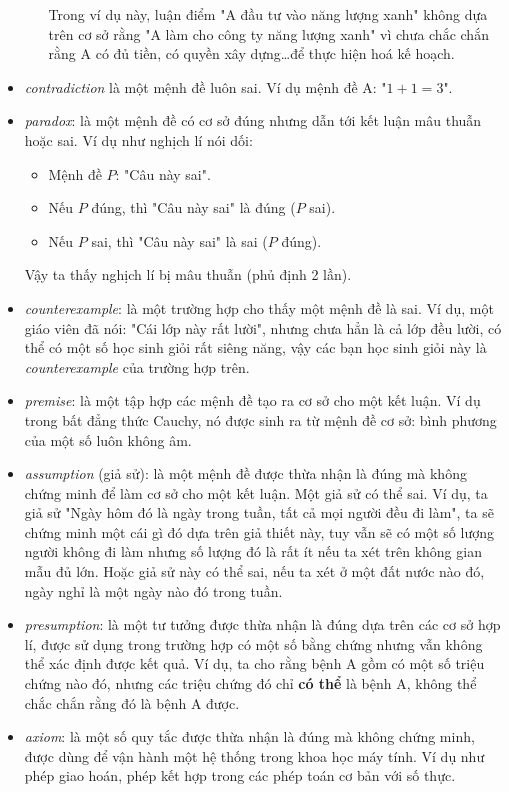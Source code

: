 \begin{itemize}
\begin{itemize}
\begin{itemize}
        \end{itemize}
        Trong ví dụ này, luận điểm "A đầu tư vào năng lượng xanh" không dựa trên cơ sở rằng "A làm cho công ty năng lượng xanh" vì chưa chắc chắn rằng A có đủ tiền, có quyền xây dựng\dots để thực hiện hoá kế hoạch.
    \end{itemize}
    \item \textit{contradiction} là một mệnh đề luôn sai. Ví dụ mệnh đề A: "$1+1=3$".
    \item \textit{paradox}: là một mệnh đề có cơ sở đúng nhưng dẫn tới kết luận mâu thuẫn hoặc sai. Ví dụ như nghịch lí nói dối: \begin{itemize}
        \item Mệnh đề $P$: "Câu này sai".
        \item Nếu $P$ đúng, thì "Câu này sai" là đúng ($P$ sai).
        \item Nếu $P$ sai, thì "Câu này sai" là sai ($P$ đúng).
    \end{itemize}
    Vậy ta thấy nghịch lí bị mâu thuẫn (phủ định 2 lần).
    \item \textit{counterexample}: là một trường hợp cho thấy một mệnh đề là sai. Ví dụ, một giáo viên đã nói: "Cái lớp này rất lười", nhưng chưa hẳn là cả lớp đều lười, có thể có một số học sinh giỏi rất siêng năng, vậy các bạn học sinh giỏi này là \textit{counterexample} của trường hợp trên.
    \item \textit{premise}: là một tập hợp các mệnh đề tạo ra cơ sở cho một kết luận. Ví dụ trong bất đẳng thức Cauchy, nó được sinh ra từ mệnh đề cơ sở: bình phương của một số luôn không âm.
    \item \textit{assumption} (giả sử): là một mệnh đề được thừa nhận là đúng mà không chứng minh để làm cơ sở cho một kết luận. Một giả sử có thể sai. Ví dụ, ta giả sử "Ngày hôm đó là ngày trong tuần, tất cả mọi người đều đi làm", ta sẽ chứng minh một cái gì đó dựa trên giả thiết này, tuy vẫn sẽ có một số lượng người không đi làm nhưng số lượng đó là rất ít nếu ta xét trên không gian mẫu đủ lớn. Hoặc giả sử này có thể sai, nếu ta xét ở một đất nước nào đó, ngày nghỉ là một ngày nào đó trong tuần.
    \item \textit{presumption}: là một tư tưởng được thừa nhận là đúng dựa trên các cơ sở hợp lí, được sử dụng trong trường hợp có một số bằng chứng nhưng vẫn không thể xác định được kết quả. Ví dụ, ta cho rằng bệnh A gồm có một số triệu chứng nào đó, nhưng các triệu chứng đó chỉ \textbf{có thể} là bệnh A, không thể chắc chắn rằng đó là bệnh A được.
    \item \textit{axiom}: là một số quy tắc được thừa nhận là đúng mà không chứng minh, được dùng để vận hành một hệ thống trong khoa học máy tính. Ví dụ như phép giao hoán, phép kết hợp trong các phép toán cơ bản với số thực.

\end{itemize}
